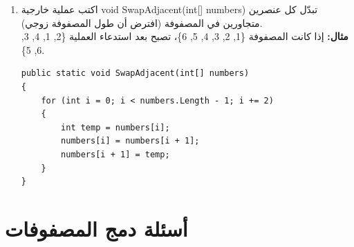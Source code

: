 \documentclass[14pt]{extarticle}
\begin{document}
\begin{enumerate}[resume, itemsep=2em]
    \item
    اكتب عملية خارجية \textenglish{void SwapAdjacent(int[] numbers)} تبدّل كل عنصرين متجاورين في المصفوفة (افترض أن طول المصفوفة زوجي).\\
    \textbf{مثال:} إذا كانت المصفوفة \textenglish{\{1, 2, 3, 4, 5, 6\}}، تصبح بعد استدعاء العملية \textenglish{\{2, 1, 4, 3, 6, 5\}}.
    \ifwithsols
    \begin{boxSolution}
    \begin{english}
    \begin{verbatim}
public static void SwapAdjacent(int[] numbers)
{
    for (int i = 0; i < numbers.Length - 1; i += 2)
    {
        int temp = numbers[i];
        numbers[i] = numbers[i + 1];
        numbers[i + 1] = temp;
    }
}
    \end{verbatim}
    \end{english}
    \end{boxSolution}
    \fi

\end{enumerate}

\clearpage

\section{أسئلة دمج المصفوفات}
\end{document}
